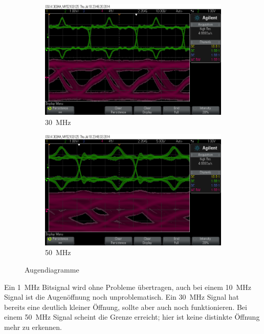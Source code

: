 \documentclass[12pt,a4paper]{article}
\begin{document}
\begin{figure}[H]
  \centering
  \begin{subfigure}[b]{0.6\textwidth}
    \includegraphics[width=\textwidth]{../measurements/20140710/eye_plots/30MHz.png}
    \caption{\SI{30}{\mega\hertz}}
  \end{subfigure}  
  \begin{subfigure}[b]{0.6\textwidth}
    \includegraphics[width=\textwidth]{../measurements/20140710/eye_plots/50MHz.png}
    \caption{\SI{50}{\mega\hertz}}
  \end{subfigure}  
  \caption{Augendiagramme}
  \label{fig:eye_plots_fast}
\end{figure}



Ein \SI{1}{\mega\hertz} Bitsignal wird ohne Probleme übertragen, auch bei einem \SI{10}{\mega\hertz} Signal ist die Augenöffnung noch unproblematisch. Ein \SI{30}{\mega\hertz} Signal hat bereits eine deutlich kleiner Öffnung, sollte aber auch noch funktionieren. Bei einem \SI{50}{\mega\hertz} Signal scheint die Grenze erreicht; hier ist keine distinkte Öffnung mehr zu erkennen. 
\end{document}
